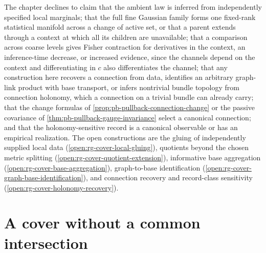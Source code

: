 The chapter declines to claim that the ambient law is inferred from independently
specified local marginals; that the full fine Gaussian family forms one
fixed-rank statistical manifold across a change of active set, or that a parent
extends through a context at which all its children are unavailable; that a
comparison across coarse levels gives Fisher contraction for derivatives in the
context, an inference-time decrease, or increased evidence, since the channels
depend on the context and differentiating in \(c\) also differentiates the
channel; that any construction here recovers a connection from data, identifies
an arbitrary graph-link product with base transport, or infers nontrivial bundle
topology from connection holonomy, which a connection on a trivial bundle can
already carry; that the change formulas of \cref{prop:pb-pullback-connection-change}
or the passive covariance of \cref{thm:pb-pullback-gauge-invariance} select a
canonical connection; and that the holonomy-sensitive record is a canonical
observable or has an empirical realization.  The open
constructions are the gluing of independently supplied local data
(\cref{open:rg-cover-local-gluing}), quotients beyond the chosen metric
splitting (\cref{open:rg-cover-quotient-extension}), informative base
aggregation (\cref{open:rg-cover-base-aggregation}), graph-to-base identification
(\cref{open:rg-cover-graph-base-identification}), and connection recovery and
record-class sensitivity (\cref{open:rg-cover-holonomy-recovery}).

\section{A cover without a common intersection}
\label{sec:rg-cover-domains}


